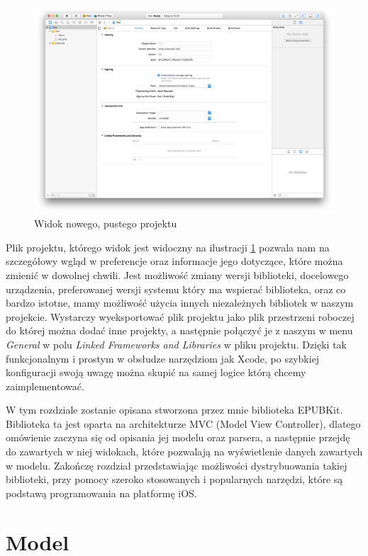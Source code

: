 \begin{figure}[ht!]
  \centering
  \includegraphics[width=120mm]{images/chapter-4-image-2-empty-project.png}
  \caption{Widok nowego, pustego projektu}
  \label{chapter-4-image-2-empty-project}
\end{figure}

Plik projektu, którego widok jest widoczny na ilustracji \ref{chapter-4-image-2-empty-project} pozwala nam na szczegółowy wgląd w preferencje oraz informacje jego dotyczące, które można zmienić w dowolnej chwili. Jest możliwość zmiany wersji biblioteki, docelowego urządzenia, preferowanej wersji systemu który ma wspierać biblioteka, oraz co bardzo istotne, mamy możliwość użycia innych niezależnych bibliotek w naszym projekcie. Wystarczy wyeksportować plik projektu jako plik przestrzeni roboczej do której można dodać inne projekty, a następnie połączyć je z naszym w menu \textit{General} w polu \textit{Linked Frameworks and Libraries} w pliku projektu. Dzięki tak funkcjonalnym i prostym w obsłudze narzędziom jak Xcode, po szybkiej konfiguracji swoją uwagę można skupić na samej logice którą chcemy zaimplementować.

W tym rozdziale zostanie opisana stworzona przez mnie biblioteka EPUBKit. Biblioteka ta jest oparta na architekturze MVC (Model View Controller), dlatego omówienie zaczyna się od opisania jej modelu oraz parsera, a następnie przejdę do zawartych w niej widokach, które pozwalają na wyświetlenie danych zawartych w modelu. Zakończę rozdział przedstawiając możliwości dystrybuowania takiej biblioteki, przy pomocy szeroko stosowanych i popularnych narzędzi, które są podstawą programowania na platformę iOS.

\section{Model}

